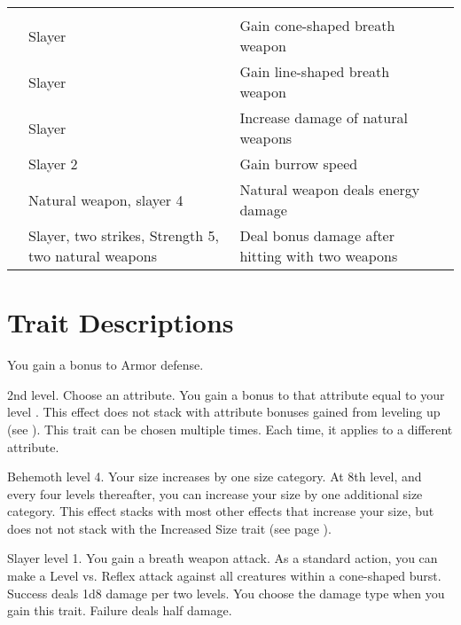 \begin{longtabuwrapper}
\begin{longtabu}{>{\lcol}p{10em} >{\lcol}p{15em} >{\lcol}X >{\lcol}p{3em}}
            \midrule
            \label{Slayer Traits} &  &  &  \\
             & Slayer & Gain cone-shaped breath weapon &  \\
             & Slayer & Gain line-shaped breath weapon &  \\
             & Slayer & Increase damage of natural weapons &  \\
             & Slayer 2 & Gain burrow speed &  \\
             & Natural weapon, slayer 4 & Natural weapon deals energy damage &  \\
             & Slayer, two strikes, Strength 5, two natural weapons & Deal bonus damage after hitting with two weapons &  \\
        \end{longtabu}
    \end{longtabuwrapper}

    \twocolumn

\section{Trait Descriptions}

    \featben You gain a  bonus to Armor defense.

    \featpre 2nd level.
    \featben Choose an attribute.
    You gain a bonus to that attribute equal to your level .
    This effect does not stack with attribute bonuses gained from leveling up (see ).
     This trait can be chosen multiple times.
    Each time, it applies to a different attribute.

    \featpre Behemoth level 4.
    \featben Your size increases by one size category.
    At 8th level, and every four levels thereafter, you can increase your size by one additional size category.
    This effect stacks with most other effects that increase your size, but does not not stack with the Increased Size trait (see page ).

    \featpre Slayer level 1.
    \featben You gain a breath weapon attack.
    As a standard action, you can make a Level vs. Reflex attack against all creatures within a \areasmall cone-shaped burst.
    Success deals 1d8 damage per two levels.
    You choose the damage type when you gain this trait.
    Failure deals half damage.

